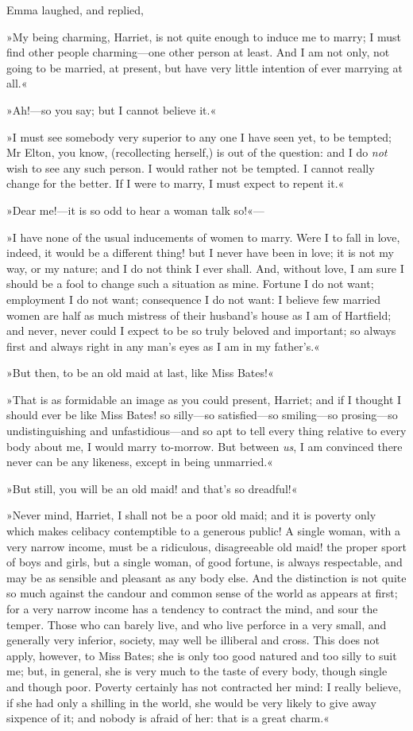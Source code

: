 Emma laughed, and replied,

»My being charming, Harriet, is not quite enough to induce me to marry; I must find other people charming—one other person at least. And I am not only, not going to be married, at present, but have very little intention of ever marrying at all.«

»Ah!—so you say; but I cannot believe it.«

»I must see somebody very superior to any one I have seen yet, to be tempted; Mr Elton, you know, (recollecting herself,) is out of the question: and I do \textit{not} wish to see any such person. I would rather not be tempted. I cannot really change for the better. If I were to marry, I must expect to repent it.«

»Dear me!—it is so odd to hear a woman talk so!«—

»I have none of the usual inducements of women to marry. Were I to fall in love, indeed, it would be a different thing! but I never have been in love; it is not my way, or my nature; and I do not think I ever shall. And, without love, I am sure I should be a fool to change such a situation as mine. Fortune I do not want; employment I do not want; consequence I do not want: I believe few married women are half as much mistress of their husband's house as I am of Hartfield; and never, never could I expect to be so truly beloved and important; so always first and always right in any man's eyes as I am in my father's.«

»But then, to be an old maid at last, like Miss Bates!«

»That is as formidable an image as you could present, Harriet; and if I thought I should ever be like Miss Bates! so silly—so satisfied—so smiling—so prosing—so undistinguishing and unfastidious—and so apt to tell every thing relative to every body about me, I would marry to-morrow. But between \textit{us}, I am convinced there never can be any likeness, except in being unmarried.«

»But still, you will be an old maid! and that's so dreadful!«

»Never mind, Harriet, I shall not be a poor old maid; and it is poverty only which makes celibacy contemptible to a generous public! A single woman, with a very narrow income, must be a ridiculous, disagreeable old maid! the proper sport of boys and girls, but a single woman, of good fortune, is always respectable, and may be as sensible and pleasant as any body else. And the distinction is not quite so much against the candour and common sense of the world as appears at first; for a very narrow income has a tendency to contract the mind, and sour the temper. Those who can barely live, and who live perforce in a very small, and generally very inferior, society, may well be illiberal and cross. This does not apply, however, to Miss Bates; she is only too good natured and too silly to suit me; but, in general, she is very much to the taste of every body, though single and though poor. Poverty certainly has not contracted her mind: I really believe, if she had only a shilling in the world, she would be very likely to give away sixpence of it; and nobody is afraid of her: that is a great charm.«

